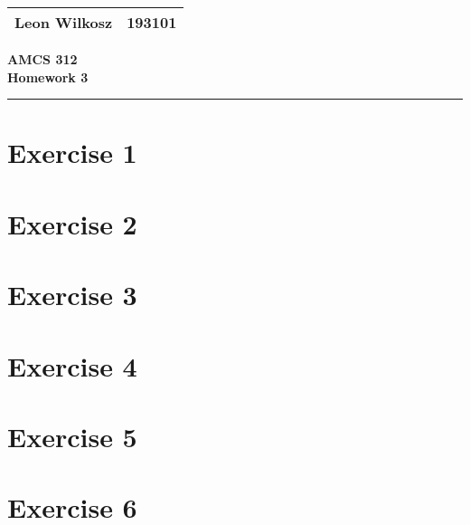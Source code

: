 \documentclass[
a4paper,
]{article}
\newcommand{\1}{\mathds{1}}
\begin{document}
	
	
	\begin{flushright}
		\begin{tabular}{|l|c|}
			\hline
			Leon Wilkosz & 193101 \\ \hline
		\end{tabular}
	\end{flushright}
	\begin{center}
		\Large \textbf{AMCS 312}\\ \medskip
		\large\textbf{Homework 3}\\
	\end{center}
	\medskip
	\hrule
	\vspace{10pt}

        \section*{Exercise 1}
		
		\null\newpage
		
        \section*{Exercise 2}
		
		\null\newpage
		
        \section*{Exercise 3}
		
		\null\newpage
		
        \section*{Exercise 4}
        
        \null\newpage
        
        \section*{Exercise 5}
        
        \null\newpage
        
        \section*{Exercise 6}
        
	    \null\newpage
        
        
\end{document}
